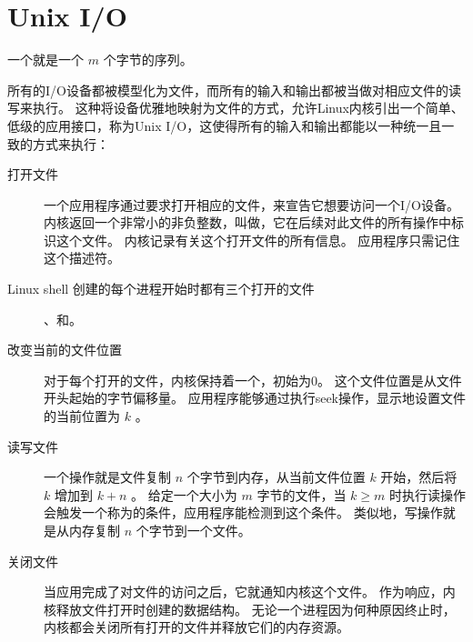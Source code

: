 
\section{Unix I/O}
{
    一个就是一个 $m$ 个字节的序列。

    所有的I/O设备都被模型化为文件，而所有的输入和输出都被当做对相应文件的读写来执行。
    这种将设备优雅地映射为文件的方式，允许Linux内核引出一个简单、低级的应用接口，称为Unix I/O，这使得所有的输入和输出都能以一种统一且一致的方式来执行：

    \begin{description}
        \item[打开文件]
        {
            一个应用程序通过要求打开相应的文件，来宣告它想要访问一个I/O设备。
            内核返回一个非常小的非负整数，叫做，它在后续对此文件的所有操作中标识这个文件。
            内核记录有关这个打开文件的所有信息。
            应用程序只需记住这个描述符。
        }
        \item[Linux shell 创建的每个进程开始时都有三个打开的文件] 、和。
        \item[改变当前的文件位置]
        {
            对于每个打开的文件，内核保持着一个，初始为0。
            这个文件位置是从文件开头起始的字节偏移量。
            应用程序能够通过执行seek操作，显示地设置文件的当前位置为 $k$ 。
        }
        \item[读写文件]
        {
            一个操作就是文件复制 $n$ 个字节到内存，从当前文件位置 $k$ 开始，然后将 $k$ 增加到 $k+n$ 。
            给定一个大小为 $m$ 字节的文件，当 $k \ge m$ 时执行读操作会触发一个称为的条件，应用程序能检测到这个条件。
            类似地，写操作就是从内存复制 $n$ 个字节到一个文件。
        }
        \item[关闭文件]
        {
            当应用完成了对文件的访问之后，它就通知内核这个文件。
            作为响应，内核释放文件打开时创建的数据结构。
            无论一个进程因为何种原因终止时，内核都会关闭所有打开的文件并释放它们的内存资源。
        }
    \end{description}
}
